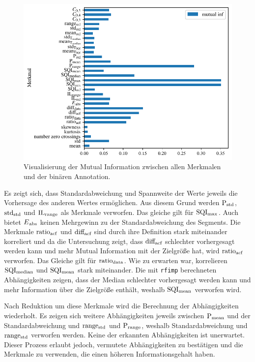 \begin{figure}[H] %
	\centering
	\includegraphics{pic/mutual-inf-own.pdf}
	\caption{Visualisierung der Mutual Information zwischen allen Merkmalen und der binären Annotation.}
	\label{fig:mutual-inf-own-all}
\end{figure}

Es zeigt sich, dass Standardabweichung und Spannweite der Werte jeweils die Vorhersage des anderen Wertes ermöglichen. Aus diesem Grund werden $\text{P}\textsubscript{std}$, $\text{std}\textsubscript{std}$ und $\text{IL}\textsubscript{range}$ als Merkmale verworfen. Das gleiche gilt für $\text{SQI}\textsubscript{max}$. Auch bietet $E\textsubscript{abs}$ keinen Mehrgewinn zu der Standardabweichung des Segments. Die Merkmale $\text{ratio}\textsubscript{acf}$ und $\text{diff}\textsubscript{acf}$ sind durch ihre Definition stark miteinander korreliert und da die Untersuchung zeigt, dass $\text{diff}\textsubscript{acf}$ schlechter vorhergesagt werden kann und mehr Mutual Information mit der Zielgröße hat, wird $\text{ratio}\textsubscript{acf}$ verworfen. Das Gleiche gilt für $\text{ratio}\textsubscript{data}$. Wie zu erwarten war, korrelieren $\text{SQI}\textsubscript{median}$ und $\text{SQI}\textsubscript{mean}$ stark miteinander. Die mit \texttt{rfimp} berechneten Abhängigkeiten zeigen, dass der Median schlechter vorhergesagt werden kann und mehr Information über die Zielgröße enthält, weshalb $\text{SQI}\textsubscript{mean}$ verworfen wird.

Nach Reduktion um diese Merkmale wird die Berechnung der Abhängigkeiten wiederholt. Es zeigen sich weitere Abhängigkeiten jeweils zwischen $\text{P}\textsubscript{mean}$ und der Standardabweichung und $\text{range}\textsubscript{std}$ und $\text{P}\textsubscript{range}$, weshalb Standardabweichung und $\text{range}\textsubscript{std}$ verworfen werden. Keine der erkannten Abhängigkeiten ist unerwartet. Dieser Prozess erlaubt jedoch, vermutete Abhängigkeiten zu bestätigen und die Merkmale zu verwenden, die einen höheren Informationsgehalt haben.

